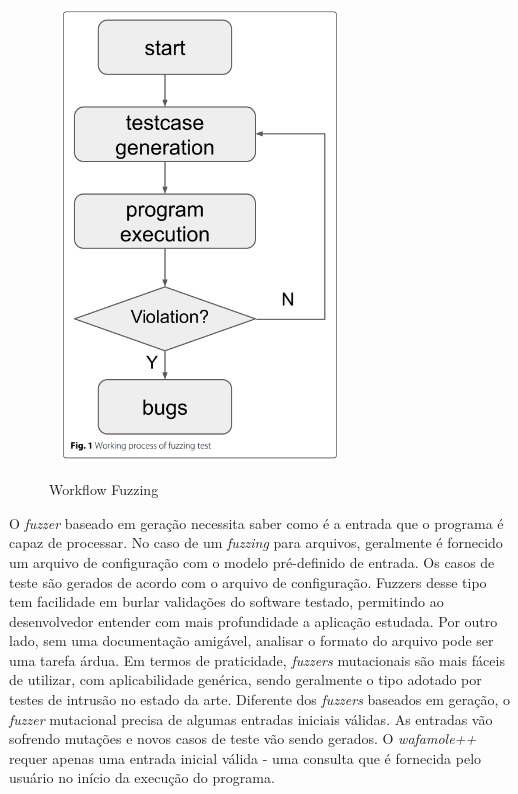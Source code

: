 \begin{figure}[ht]
    \centering
    \caption{Workflow Fuzzing}
    \includegraphics[width=8cm,height=12cm,keepaspectratio]{figuras/fuzzing imagem.png} 
    \label{fig:internet} 
\end{figure}

O \textit{fuzzer} baseado em geração necessita saber como é a entrada que o programa é capaz de processar. No caso de um \textit{fuzzing} para arquivos, geralmente é fornecido um arquivo de configuração com o modelo pré-definido de entrada. Os casos de teste são gerados de acordo com o arquivo de configuração. Fuzzers desse tipo tem facilidade em burlar validações do software testado, permitindo ao desenvolvedor entender com mais profundidade a aplicação estudada. Por outro lado, sem uma documentação amigável, analisar o formato do arquivo pode ser uma tarefa árdua.
Em termos de praticidade, \textit{fuzzers} mutacionais são mais fáceis de utilizar, com aplicabilidade genérica, sendo geralmente o tipo adotado por testes de intrusão no estado da arte. Diferente dos \textit{fuzzers} baseados em geração, o \textit{fuzzer} mutacional precisa de algumas entradas iniciais válidas. As entradas vão sofrendo mutações e novos casos de teste vão sendo gerados. O \textit{wafamole++} requer apenas uma entrada inicial válida - uma consulta que é fornecida pelo usuário no início da execução do programa.

